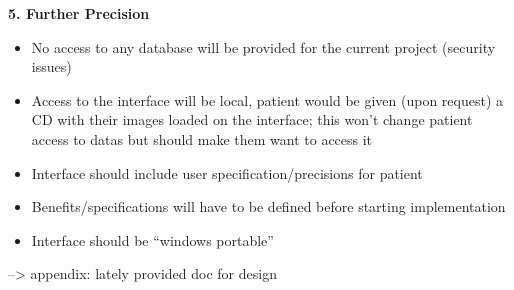 \newline \vspace{5mm}
\textbf{5. Further Precision}
\begin{itemize}
\item No access to any database will be provided for the current project (security issues) 
\item Access to the interface will be local, patient would be given (upon request) a CD with their images loaded on the interface; this won’t change patient access to datas but should make them want to access it
\item Interface should include user specification/precisions for patient 
\item Benefits/specifications will have to be defined before starting implementation
\item Interface should be “windows portable” 
\end{itemize}


--> appendix: lately provided doc for design

